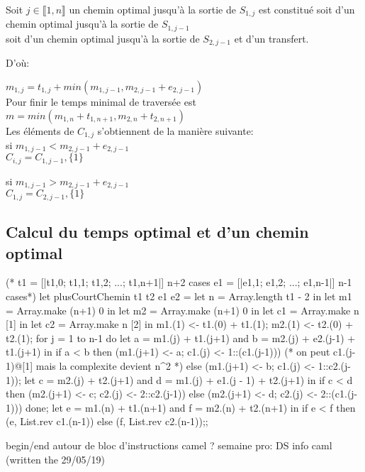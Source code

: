 \documentclass{article}
\begin{document}
									Soit $j \in \llbracket 1, n \rrbracket$ un chemin optimal jusqu'à la sortie de $S_{1,j}$ est constitué soit d'un chemin optimal jusqu'à la sortie de $S_{1,j-1}$\\
									soit d'un chemin optimal jusqu'à la sortie de $S_{2, j-1}$ et d'un transfert.
									
									D'où:
									
									$m_{1,j} = t_{1,j} + min(m_{1,j-1}, m_{2,j-1} + e_{2,j-1})$\\
									Pour finir le temps minimal de traversée est\\
									$m = min(m_{1,n} + t_{1,n+1},m_{2,n} + t_{2, n+1})$\\
									Les éléments de $C_{1,j}$ s'obtiennent de la manière suivante:\\
									si $m_{1,j-1} < m_{2,j-1} + e_{2,j-1}$\\
									$C_{i,j} = C_{1,j-1}, \{1\}$
									
									si $m_{1,j-1} > m_{2,j-1} + e_{2,j-1}$\\
									$C_{1,j} = C_{2,j-1},\{1\}$
								
								\subsection{Calcul du temps optimal et d'un chemin optimal}
								
									\begin{case}
(* t1 = [|t1,0; t1,1; t1,2; ...; t1,n+1|] n+2 cases
e1 = [|e1,1; e1,2; ...; e1,n-1|] n-1 cases*)
let plusCourtChemin t1 t2 e1 e2 =
	let n = Array.length t1 - 2 in
	let m1 = Array.make (n+1) 0 in
	let m2 = Array.make (n+1) 0 in
	let c1 = Array.make n [1] in
	let c2 = Array.make n [2] in
	m1.(1) <- t1.(0) + t1.(1);
	m2.(1) <- t2.(0) + t2.(1);
	for j = 1 to n-1 do
		let a = m1.(j) + t1.(j+1) and
		b = m2.(j) + e2.(j-1) + t1.(j+1) in 
		if a < b then
			(m1.(j+1) <- a; c1.(j) <- 1::(c1.(j-1)))
			(* on peut c1.(j-1)@[1] mais la complexite devient n^2 *)
		else
			(m1.(j+1) <- b; c1.(j) <- 1::c2.(j-1));
		let c = m2.(j) + t2.(j+1) and
			d = m1.(j) + e1.(j - 1) + t2.(j+1) in
		if c < d then
			(m2.(j+1) <- c; c2.(j) <- 2::c2.(j-1))
		else
			(m2.(j+1) <- d; c2.(j) <- 2::(c1.(j-1)))
	done;
	let e = m1.(n) + t1.(n+1) and f = m2.(n) + t2.(n+1) in
	if e < f then (e, List.rev c1.(n-1))
	else (f, List.rev c2.(n-1));;
									\end{case}
					
					begin/end autour de bloc d'instructions camel ?
					semaine pro: DS info caml (written the 29/05/19)
					
\end{document}
